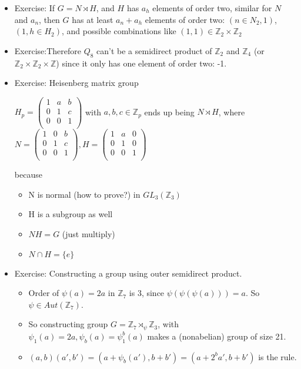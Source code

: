 \documentclass[11pt, oneside]{article}   	%
\begin{document}
\begin{itemize}
\item Exercise: If $G  = N \rtimes H$, and $H$ has $a_h$ elements of order two, similar for $N$ and $a_n$, then $G$ has at least $a_n + a_h$ elements of order two: $(n \in N_2, 1)$, $(1, h \in H_2)$, and possible combinations like $(1,1) \in \mathbb{Z}_2 \times \mathbb{Z}_2 $
\item Exercise:Therefore $Q_8$ can't be a semidirect product of $\mathbb{Z}_2$ and $\mathbb{Z}_4$ (or $\mathbb{Z}_2 \times \mathbb{Z}_2 \times \mathbb{Z}$) since it only has one element of order two: -1.
\item Exercise: Heisenberg matrix group

$H_p = \begin{pmatrix}
    1      & a & b \\
    0       & 1 & c \\
    0       & 0 & 1 \\
\end{pmatrix}$ with $a, b, c \in \mathbb{Z}_p$ ends up being $N \rtimes H$, where  $N = \begin{pmatrix}
    1      & 0  & b \\
    0       & 1 & c \\
    0       & 0 & 1 \\
\end{pmatrix},  H = \begin{pmatrix}
    1      & a  & 0 \\
    0       & 1 & 0 \\
    0       & 0 & 1 \\
\end{pmatrix}$

because
\begin{itemize}
\item N is normal (how to prove?) in $GL_3(\mathbb{Z}_3)$
\item H is a subgroup as well
\item $NH = G $ (just multiply)
\item $N \cap H = \{e\}$
\end{itemize}
\item Exercise: Constructing a group using outer semidirect product.
\begin{itemize}
  \item Order of $\psi(a) = 2a$ in $\mathbb{Z}_7$ is 3, since $\psi(\psi(\psi(a))) = a$.  So $\psi \in Aut(\mathbb{Z}_7)$.  
  \item So constructing group  $G = \mathbb{Z}_7  \rtimes_{\psi} \mathbb{Z}_3$, with $\psi_1(a) = 2a, \psi_b(a) = \psi_1^b(a)$ makes a (nonabelian) group of size 21.  
  \item $(a, b)(a', b') = (a+\psi_b(a'), b+b') = (a+2^ba', b+b')$ is the rule.
  \end{itemize}


\end{itemize}
\end{document}
